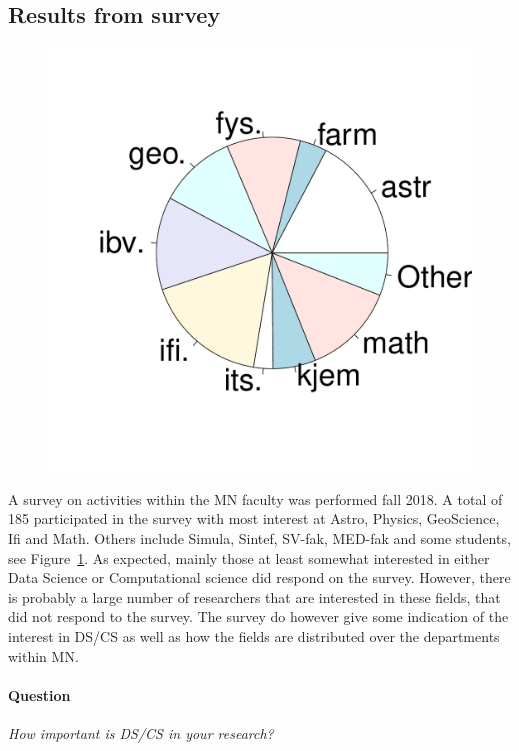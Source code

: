 \documentclass[a4paper,10pt]{article}
\begin{document}
\subsection{Results from survey}
\begin{figure}
\centering
\includegraphics[scale=0.3,trim={0.5cm 2.7cm 0cm 2.4cm},clip]{pie_dept.pdf}
\caption{\label{fig:deptdistr}}
\end{figure}
A survey on activities within the MN faculty was performed fall 2018. A total of 185 participated in the survey with most interest at Astro, Physics, GeoScience, Ifi and Math.
Others include Simula, Sintef, SV-fak, MED-fak and some students, see Figure~\ref{fig:deptdistr}. As expected, mainly those at least somewhat interested in either Data Science or Computational science did respond on the survey. However, there is probably a large number of researchers that are interested in these fields, that did not respond to the survey. The survey do however give some indication of the interest in DS/CS as well as how the fields are distributed over the departments within MN. 


\paragraph{Question} \textit{How important is DS/CS in your research?}\\
\end{document}
